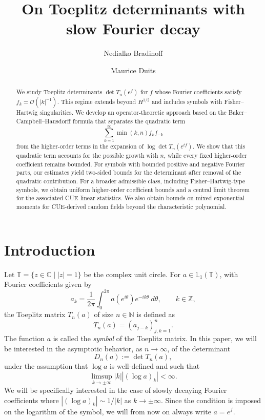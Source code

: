 \documentclass[11pt]{amsart}
\author{Nedialko Bradinoff \and Maurice Duits}
\title{On Toeplitz determinants with slow Fourier decay}
\date{}
\theoremstyle{plain}
\theoremstyle{remark}
\numberwithin{equation}{section}
\begin{document}
\vspace*{-11pt}
\begin{abstract}
We study Toeplitz determinants \(\det T_n(e^f)\) for \(f\) whose Fourier coefficients satisfy \(f_k=\mathcal O(|k|^{-1})\). This regime extends beyond \(H^{1/2}\) and includes symbols with Fisher--Hartwig singularities. We develop an operator-theoretic approach based on the Baker--Campbell--Hausdorff formula that separates the quadratic term \[ \sum_{k=1}^{\infty}\min(k,n)f_kf_{-k} \] from the higher-order terms in the expansion of \(\log\det T_n(e^{tf})\). We show that this quadratic term accounts for the possible growth with \(n\), while every fixed higher-order coefficient remains bounded. For symbols with bounded positive and negative Fourier parts, our estimates yield two-sided bounds for the determinant after removal of the quadratic contribution. For a broader admissible class, including Fisher--Hartwig-type symbols, we obtain uniform higher-order coefficient bounds and a central limit theorem for the associated CUE linear statistics.  We also obtain bounds on mixed exponential moments for CUE-derived random fields beyond the characteristic polynomial.
\end{abstract}
%
%
\maketitle
%
\tableofcontents
%
\section{Introduction}
%
%
Let $\mathbb T= \{z \in \mathbb C \mid |z|=1\}$ be the complex unit circle. For $a \in \mathbb L_1(\mathbb T)$, with Fourier coefficients given by 
\begin{equation} \label{eq:def_fourier_coefficient}
    a_k=\frac{1}{2 \pi } \int_0^{2 \pi} a(e^{i \theta}) e^{-ik\theta}  \ d \theta, \qquad k \in \mathbb Z,
\end{equation}
the Toeplitz matrix $T_n(a)$ of size $n \in \mathbb N$ is defined as 
\begin{equation}\label{eq:def_Toeplitz_matrix}
    T_n(a)= (a_{j-k})_{j,k=1}^n.
\end{equation}
The function $a$ is called the \textit{symbol} of the Toeplitz matrix. In this paper, we will be interested in the asymptotic behavior, as $n\to \infty$, of the determinant 
\begin{equation}\label{eq:def_Toeplitz_determinant}
 D_n(a):= \det T_n(a),
\end{equation}
under the assumption that $\log a$ is well-defined and such that  
\begin{equation}\label{eqn:bound_on-log}
\limsup_{k\to \pm \infty}  |k||(\log a)_k|< \infty.
\end{equation}
We will be specifically interested in the case of slowly decaying Fourier coefficients where $|(\log a)_k|\sim 1/|k|$ as $k \to \pm \infty$. Since the condition is imposed on the logarithm of the symbol, we will from now on always write $a=e^f$. 
\end{document}
